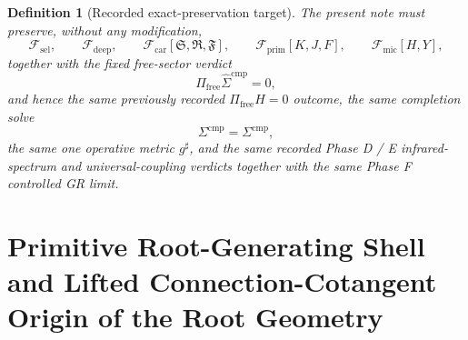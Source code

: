 \documentclass[11pt]{article}
\newcommand{\CompletedMetric}{g^{\sharp}}
\newcommand{\CompShift}{\Sigma^{\mathrm{cmp}}}
\newcommand{\CompLift}{\widehat\Sigma^{\mathrm{cmp}}}
\newcommand{\FreeProj}{\Pi_{\mathrm{free}}}
\newcommand{\GaugeAux}{Y}
\newcommand{\MicFunctional}{\mathscr F_{\mathrm{mic}}}
\newcommand{\PrimFunctional}{\mathscr F_{\mathrm{prim}}}
\newcommand{\CarrierFunctional}{\mathscr F_{\mathrm{car}}}
\newcommand{\DeepFunctional}{\mathscr F_{\mathrm{deep}}}
\newcommand{\StemFunctional}{\mathscr F_{\mathrm{sel}}}
\newcommand{\PrimStrain}{K}
\newcommand{\PrimNeutral}{J}
\newcommand{\PrimFree}{F}
\newcommand{\CarrierSeed}{\mathfrak S}
\newcommand{\RelabelSeed}{\mathfrak R}
\newcommand{\FreeSeed}{\mathfrak F}
\newtheorem{definition}{Definition}
\begin{document}
\begin{definition}[Recorded exact-preservation target]
\label{def:recorded_target}
The present note must preserve, without any modification,
\begin{equation}
\StemFunctional,
\qquad
\DeepFunctional,
\qquad
\CarrierFunctional[\CarrierSeed,\RelabelSeed,\FreeSeed],
\qquad
\PrimFunctional[\PrimStrain,\PrimNeutral,\PrimFree],
\qquad
\MicFunctional[H,\GaugeAux],
\label{eq:target_functionals}
\end{equation}
together with the fixed free-sector verdict
\begin{equation}
\FreeProj\CompLift=0,
\label{eq:target_free}
\end{equation}
and hence the same previously recorded \(\Pi_{\mathrm{free}}H=0\) outcome, the same completion solve
\begin{equation}
\CompShift=\Sigma^{\mathrm{cmp}},
\label{eq:target_sigma}
\end{equation}
the same one operative metric \(\CompletedMetric\), and the same recorded Phase D / E infrared-spectrum and universal-coupling verdicts together with the same Phase F controlled GR limit.
\end{definition}

\section{Primitive Root-Generating Shell and Lifted Connection-Cotangent Origin of the Root Geometry}
\end{document}
